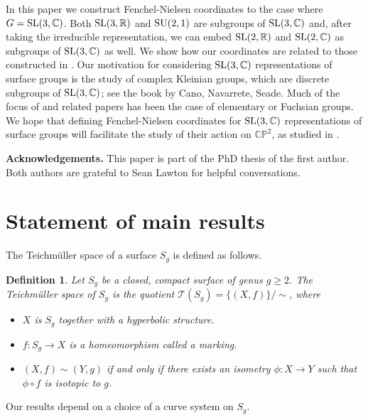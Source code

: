 \documentclass[11pt]{amsart}
\newtheorem{definition}[theorem]{Definition}
\numberwithin{equation}{section}
\begin{document}
In this paper we construct Fenchel-Nielsen coordinates to the case where $G={\rm SL}(3,{\mathbb C})$. 
Both ${\rm SL}(3,{\mathbb R})$ and ${\rm SU}(2,1)$ are subgroups of ${\rm SL}(3,{\mathbb C})$ and, after taking the 
irreducible representation, we can embed ${\rm SL}(2,{\mathbb R})$ and ${\rm SL}(2,{\mathbb C})$ as subgroups of 
${\rm SL}(3,{\mathbb C})$ 
as well. We show how our coordinates are related to those constructed in \cite{Kou,Tan,Gol,PP}. Our motivation for considering
${\rm SL}(3,{\mathbb C})$ representations of surface groups is the study of complex Kleinian groups, which are discrete 
subgroups 
of ${\rm SL}(3,{\mathbb C})$; see the book \cite{C-N-S} by Cano, Navarrete, Seade. Much of the focus of \cite{C-N-S} and 
related papers has been
the case of elementary or Fuchsian groups. We hope that defining Fenchel-Nielsen coordinates for 
${\rm SL}(3,{\mathbb C})$ representations of surface groups will facilitate the study of their action on 
${\mathbb C}{\mathbb P}^2$, as studied in \cite{C-N-S}. 

\noindent
{\bf Acknowledgements.}
This paper is part of the PhD thesis of the first author. Both authors are grateful to Sean Lawton for helpful conversations.


\section{Statement of main results}

The Teichm\"uller space of a surface $S_g$ is defined as follows.

\begin{definition}\label{def-Teich}
	Let $S_g$ be a closed, compact surface of genus $g\geq2$. The Teichm\"uller space of $S_g$ is the quotient 
	$\mathcal{T}(S_g)=\{(X,f)\}/\sim$, where
	\begin{itemize}
		\item $X$ is $S_g$ together with a hyperbolic structure.
		\item $f:S_g\rightarrow X$ is a homeomorphism called a marking.
		\item $(X,f)\sim(Y,g)$ if and only if there exists an isometry $\phi:X\rightarrow Y$ such that $\phi\circ f$ is isotopic to $g$.
	\end{itemize}
\end{definition}


Our results depend on a choice of a curve system on $S_g$.
\end{document}
